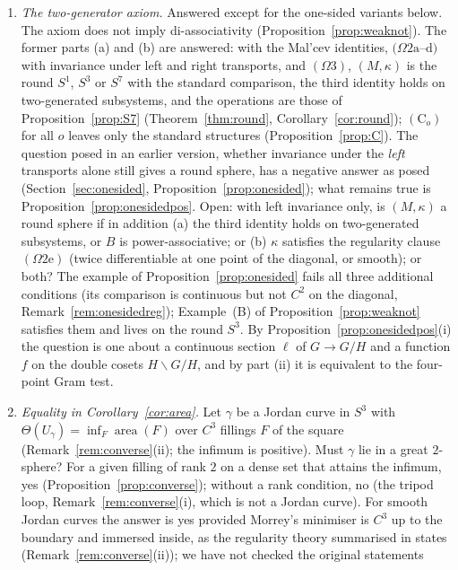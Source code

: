 \documentclass[11pt,reqno]{amsart}
\theoremstyle{definition}
\theoremstyle{remark}
\numberwithin{equation}{section}
\begin{document}
\begin{enumerate}[label=\textbf{Q\arabic*.},leftmargin=2.6em]
\item \emph{The two-generator axiom.}  Answered except for the one-sided variants below.  The axiom does not imply di-associativity
(Proposition~\ref{prop:weaknot}).
The former parts (a) and (b) are answered: with the Mal'cev identities, $(\Omega2\mathrm a$--$\mathrm d)$ with invariance under left and
right transports, and $(\Omega3)$, $(M,\kappa)$ is the round $S^1$, $S^3$ or $S^7$ with the standard comparison, the third identity holds on
two-generated subsystems, and the operations are those of Proposition~\ref{prop:S7} (Theorem~\ref{thm:round}, Corollary~\ref{cor:round});
$(\mathrm C_o)$ for all $o$ leaves only the standard structures (Proposition~\ref{prop:C}).  The question posed in an earlier version,
whether invariance under the \emph{left} transports alone still gives a round sphere, has a negative answer as posed
(Section~\ref{sec:onesided}, Proposition~\ref{prop:onesided}); what remains true is Proposition~\ref{prop:onesidedpos}.  Open: with left invariance only,
is $(M,\kappa)$ a round sphere if in addition (a) the third identity holds on two-generated subsystems, or $B$ is power-associative; or (b)
$\kappa$ satisfies the regularity clause $(\Omega2\mathrm e)$ (twice differentiable at one point of the diagonal, or smooth); or both?  The example of
Proposition~\ref{prop:onesided} fails all three additional conditions (its comparison is continuous but not $C^2$ on the diagonal,
Remark~\ref{rem:onesidedreg}); Example~(B) of Proposition~\ref{prop:weaknot} satisfies them and lives on the round $S^3$.  By Proposition~\ref{prop:onesidedpos}(i) the question is one about a continuous section $\ell$ of $G\to G/H$ and a function $f$ on the
double cosets $H\backslash G/H$, and by part (ii) it is equivalent to the four-point Gram test.
\item \emph{Equality in Corollary~\ref{cor:area}.}  Let $\gamma$ be a Jordan curve in $S^3$ with $\Theta(U_\gamma)=\inf_F\operatorname{area}(F)$ over $C^3$
fillings $F$ of the square (Remark~\ref{rem:converse}(ii); the infimum is positive).  Must $\gamma$ lie in a great $2$-sphere?  For a given filling of rank $2$ on a dense set that attains the infimum,
yes (Proposition~\ref{prop:converse}); without a rank condition, no (the tripod loop, Remark~\ref{rem:converse}(i), which is not a Jordan curve).
For smooth Jordan curves the answer is yes provided Morrey's minimiser is $C^3$ up to the boundary and immersed inside, as the
regularity theory summarised in \cite{White16} states (Remark~\ref{rem:converse}(ii)); we have not checked the original statements

\end{enumerate}
\end{document}

